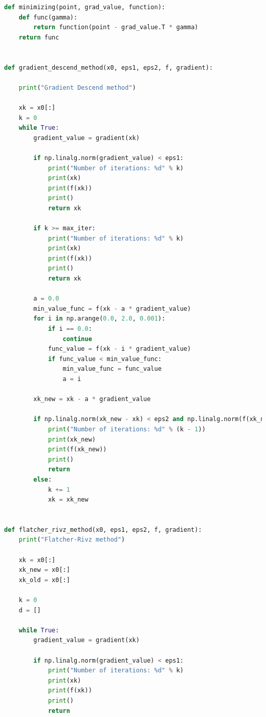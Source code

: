 \documentclass[a4paper, 14pt]{extarticle}
\begin{document}
\begin{lstlisting}[language={python},caption={Методы многомерного поиска. Генетический алгоритм},label={lst:code1}]
def minimizing(point, grad_value, function):
    def func(gamma):
        return function(point - grad_value.T * gamma)
    return func


def gradient_descend_method(x0, eps1, eps2, f, gradient):

    print("Gradient Descend method")

    xk = x0[:]
    k = 0
    while True:
        gradient_value = gradient(xk)

        if np.linalg.norm(gradient_value) < eps1:
            print("Number of iterations: %d" % k)
            print(xk)
            print(f(xk))
            print()
            return xk

        if k >= max_iter:
            print("Number of iterations: %d" % k)
            print(xk)
            print(f(xk))
            print()
            return xk

        a = 0.0
        min_value_func = f(xk - a * gradient_value)
        for i in np.arange(0.0, 2.0, 0.001):
            if i == 0.0:
                continue
            func_value = f(xk - i * gradient_value)
            if func_value < min_value_func:
                min_value_func = func_value
                a = i

        xk_new = xk - a * gradient_value

        if np.linalg.norm(xk_new - xk) < eps2 and np.linalg.norm(f(xk_new) - f(xk)):
            print("Number of iterations: %d" % (k - 1))
            print(xk_new)
            print(f(xk_new))
            print()
            return
        else:
            k += 1
            xk = xk_new


def flatcher_rivz_method(x0, eps1, eps2, f, gradient):
    print("Flatcher-Rivz method")

    xk = x0[:]
    xk_new = x0[:]
    xk_old = x0[:]

    k = 0
    d = []

    while True:
        gradient_value = gradient(xk)

        if np.linalg.norm(gradient_value) < eps1:
            print("Number of iterations: %d" % k)
            print(xk)
            print(f(xk))
            print()
            return


\end{lstlisting}
\end{document}
